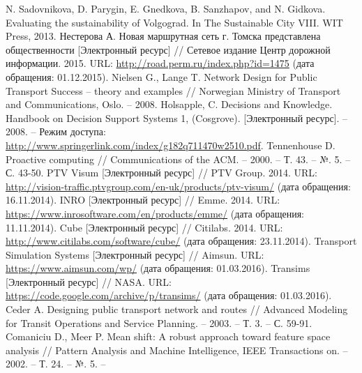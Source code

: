 \renewcommand{\bibname}{%
    \vspace{-2em}\begin{center}
        Список используемой литературы
    \end{center}\vspace{-2em}
}

\begin{thebibliography}{10}
     N. Sadovnikova, D. Parygin, E. Gnedkova, B. Sanzhapov, and N. Gidkova. 
        Evaluating the sustainability of Volgograd. In The Sustainable City VIII. WIT Press, 2013.
     Нестерова А. Новая маршрутная сеть г. Томска представлена общественности 
        [Электронный ресурс] // Сетевое издание Центр дорожной информации. 2015. URL: 
        \url{http://road.perm.ru/index.php?id=1475} (дата обращения: 01.12.2015).
     Nielsen G., Lange T. Network Design for Public Transport Success -- theory and 
        examples // Norwegian Ministry of Transport and Communications, Oslo. -- 2008.
     Holsapple, C. Decisions and Knowledge. Handbook on Decision Support Systems 1, 
        (Cosgrove). [Электронный ресурс]. -- 2008. -- Режим доступа: 
        \url{http://www.springerlink.com/index/g182q711470w2510.pdf}.
     Tennenhouse D. Proactive computing //
        Communications of the ACM. -- 2000. -- Т. 43. -- №. 5. -- С. 43-50.
     PTV Visum [Электронный ресурс] // PTV Group. 2014. URL: 
        \url{http://vision-traffic.ptvgroup.com/en-uk/products/ptv-visum/} 
        (дата обращения: 16.11.2014).
     INRO [Электронный ресурс] // Emme. 2014. URL: 
        \url{https://www.inrosoftware.com/en/products/emme/} (дата обращения: 11.11.2014).
     Cube [Электронный ресурс] // Citilabs. 2014. URL: 
        \url{http://www.citilabs.com/software/cube/} (дата обращения: 23.11.2014).
     Transport Simulation Systems [Электронный ресурс] // Aimsun. URL: 
        \url{https://www.aimsun.com/wp/} (дата обращения: 01.03.2016).
     Transims [Электронный ресурс] // NASA. URL: 
        \url{https://code.google.com/archive/p/transims/} (дата обращения: 01.03.2016).
     Ceder A. Designing public transport network and routes //
        Advanced Modeling for Transit Operations and Service Planning. -- 2003. -- Т. 3. -- С. 59-91.
     Comaniciu D., Meer P. Mean shift: A robust approach toward feature space analysis //
        Pattern Analysis and Machine Intelligence, IEEE Transactions on. -- 2002. -- Т. 24. -- №. 5. -- 

\end{thebibliography}
